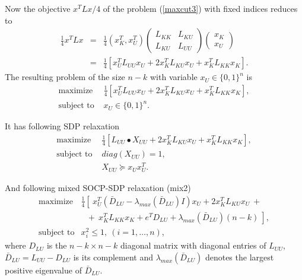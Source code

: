 \documentclass[12pt]{book}
\theoremstyle{definition}
\begin{document}

Now the objective $x^TLx/4$ of the problem (\ref{maxcut3}) with fixed indices reduces to 
\begin{eqnarray*}
\frac{1}{4}x^TLx &=& \frac{1}{4}(x_K^T , x_U^T )
\left(\begin{array}{rr} L_{KK} & L_{KU} \\ L_{KU} & L_{UU} \end{array}\right)\left(\begin{array}{c} x_K \\ x_U \end{array}\right) \\
&=& \frac{1}{4} \left[ x^T_UL_{UU}x_U +2x^T_KL_{KU}x_U + x^T_KL_{KK}x_K \right].
\end{eqnarray*}
The resulting problem of the size $n-k$ with variable $x_U\in\{0,1\}^n$ 
is 
\begin{equation}
\begin{array}{ll}
\mbox{maximize } & \frac{1}{4} \left[ x^T_UL_{UU}x_U +2x^T_KL_{KU}x_U + x^T_KL_{KK}x_K \right], \\
\mbox{subject to } & x_U\in\{0,1\}^n.
\end{array}
\end{equation}


It has following SDP relaxation 
\begin{equation}
\begin{array}{ll}
\mbox{maximize } & \frac{1}{4} \left[ L_{UU}\bullet X_{UU} +2x^T_KL_{KU}x_U + x^T_KL_{KK}x_K \right], \\
\mbox{subject to } & diag(X_{UU}) = 1, \\
				& X_{UU}\succeq x_Ux_U^T.
\end{array}
\end{equation}

And following mixed SOCP-SDP relaxation (mix2)
\begin{equation}
\begin{array}{ll}
\mbox{maximize} & \frac{1}{4}\left[ \ x_U^T(\bar{D}_{LU} - \lambda_{max}(\bar{D}_{LU})I)x_U  + 2x^T_KL_{KU}x_U \ +  \ \right. \\
	& \left. \ \ \ + \ x^T_KL_{KK}x_K + e^TD_{LU} + \lambda_{max}(\bar{D}_{LU})(n-k)  \ \right], \\
\mbox{subject to} &  x_i^2 \leq 1, \ (i=1,\dots ,n),
\end{array}
\end{equation}
where $D_{LU}$ is the $n-k\times n-k$ diagonal matrix  with diagonal entries of $L_{UU}$, $\bar{D}_{LU} = L_{UU} - D_{LU}$ is its complement and $\lambda_{max}(\bar{D}_{LU})$ denotes the largest positive eigenvalue of $\bar{D}_{LU}.$
\end{document}
